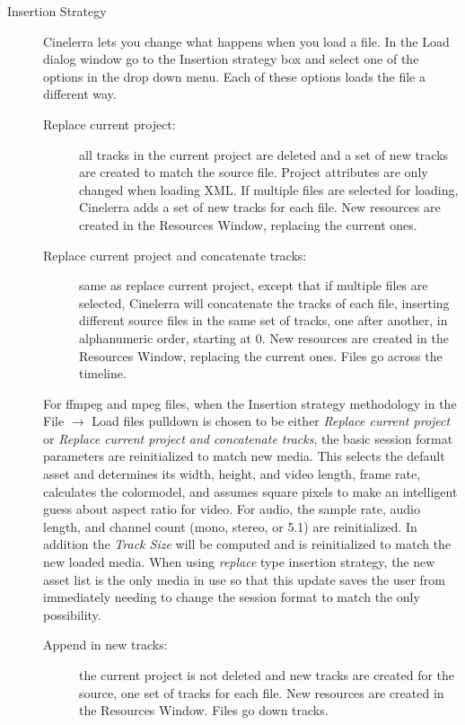 \begin{description}
    \item[Insertion Strategy] 
    Cinelerra lets you change what happens when you load a file.  In the Load dialog window go to the Insertion strategy box and select one of the options in the drop down menu. Each of these options loads the file a different way.
    
    \begin{description}
       \item [Replace current project:] all tracks in the current project are deleted and a set of new tracks are created to match the source file.  Project attributes are only changed when loading XML. If multiple files are selected for loading, Cinelerra adds a set of new tracks for each file. New resources are created in the Resources Window, replacing the current ones.
       \item [Replace current project and concatenate tracks: ] same as replace current project, except that if multiple files are selected, Cinelerra will concatenate the tracks of each file, inserting different source files in the same set of tracks, one after another, in alphanumeric order, starting at 0. New resources are created in the Resources Window, replacing the current ones.  Files go across the timeline.
    \end{description}
    For ffmpeg and mpeg files, when the Insertion strategy methodology in the File $\rightarrow$ Load files pulldown is chosen to be either \textit{Replace current project} or \textit{Replace current project and concatenate tracks}, the basic session format parameters are reinitialized to match new media.  This selects the default asset and determines its width, height, and video length, frame rate, calculates the colormodel, and assumes square pixels to make an intelligent guess about aspect ratio for video.  For audio, the sample rate, audio length, and channel count (mono, stereo, or 5.1) are reinitialized.  In addition the \textit{Track Size} will be computed and is reinitialized to match the new loaded media.  When using \textit{replace} type insertion strategy, the new asset list is the only media in use so that this update saves the user from immediately needing to change the session format to match the only possibility.
    \begin{description}
        \item[Append in new tracks:] the current project is not deleted and new tracks are created for the source, one set of tracks for each file. New resources are created in the Resources Window.  Files go down tracks.

\end{description}
\end{description}
